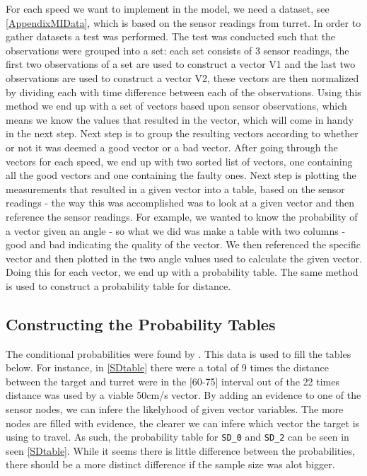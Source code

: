For each speed we want to implement in the model, we need a dataset, see
\autoref{AppendixMIData}, which is based on the sensor readings from turret. In
order to gather datasets a test was performed. The test was conducted such that
the observations were grouped into a set: each set consists of 3 sensor
readings, the first two observations of a set are used to construct a vector V1
and the last two observations are used to construct a vector V2, these vectors
are then normalized by dividing each with time difference between each of the observations. Using this method we end up
with a set of vectors based upon sensor observations, which means we know the
values that resulted in the vector, which will come in handy in the next step.
Next step is to group the resulting vectors according to whether or not it was
deemed a good vector or a bad vector. After going through the vectors for each
speed, we end up with two sorted list of vectors, one containing all the good
vectors and one containing the faulty ones. Next step is plotting the 
measurements that resulted in a given vector into a table, based on the sensor
readings - the way this was accomplished was to look at a given vector and then
reference the sensor readings. For example, we wanted to know the probability of
a vector given an angle - so what we did was make a table with two columns -
good and bad indicating the quality of the vector. We then referenced the
specific vector and then plotted in the two angle values used to calculate the
given vector. Doing this for each vector, we end up with a probability table.
The same method is used to construct a probability table for distance.
\subsection{Constructing the Probability Tables}


The conditional probabilities were found by .
This data is used to fill the tables below. For instance, in \autoref{SDtable}
there were a total of 9 times the distance between the target and turret were in
the [60-75] interval out of the 22 times distance was used by a viable
50cm/s vector. By adding an evidence to one of the sensor nodes, we can infere
the likelyhood of given vector variables. The more nodes are filled with
evidence, the clearer we can infere which vector the target is using to
travel. As such, the probability table for \texttt{SD\_0} and \texttt{SD\_2} can
be seen in seen \autoref{SDtable}. While it seems there is little difference
between the probabilities, there should be a more distinct difference if the
sample size was alot bigger.

